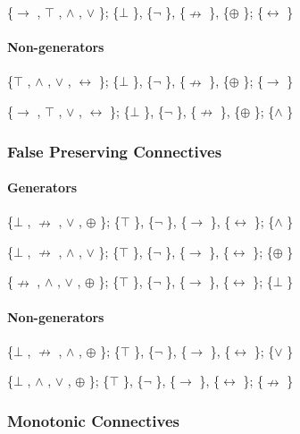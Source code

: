 \{$\to$ , $\top$ , $\land$ , $\lor$ \}; \{$\bot$ \}, \{$\neg$ \}, \{$\nrightarrow$ \}, \{$\oplus$ \}; \{$\leftrightarrow$ \}

\hypertarget{non-generators-3}{%
\paragraph{Non-generators}\label{non-generators-3}}

\{$\top$ , $\land$ , $\lor$ , $\leftrightarrow$ \}; \{$\bot$ \}, \{$\neg$ \}, \{$\nrightarrow$ \}, \{$\oplus$ \}; \{$\to$ \}

\{$\to$ , $\top$ , $\lor$ , $\leftrightarrow$ \}; \{$\bot$ \}, \{$\neg$ \}, \{$\nrightarrow$ \}, \{$\oplus$ \}; \{$\land$ \}

\hypertarget{false-preserving-connectives-1}{%
\subsubsection{False Preserving
Connectives}\label{false-preserving-connectives-1}}

\hypertarget{generators-4}{%
\paragraph{Generators}\label{generators-4}}

\{$\bot$ , $\nrightarrow$ , $\lor$ , $\oplus$ \}; \{$\top$ \}, \{$\neg$ \}, \{$\to$ \}, \{$\leftrightarrow$ \}; \{$\land$ \}

\{$\bot$ , $\nrightarrow$ , $\land$ , $\lor$ \}; \{$\top$ \}, \{$\neg$ \}, \{$\to$ \}, \{$\leftrightarrow$ \}; \{$\oplus$ \}

\{$\nrightarrow$ , $\land$ , $\lor$ , $\oplus$ \}; \{$\top$ \}, \{$\neg$ \}, \{$\to$ \}, \{$\leftrightarrow$ \}; \{$\bot$ \}

\hypertarget{non-generators-4}{%
\paragraph{Non-generators}\label{non-generators-4}}

\{$\bot$ , $\nrightarrow$ , $\land$ , $\oplus$ \}; \{$\top$ \}, \{$\neg$ \}, \{$\to$ \}, \{$\leftrightarrow$ \}; \{$\lor$ \}

\{$\bot$ , $\land$ , $\lor$ , $\oplus$ \}; \{$\top$ \}, \{$\neg$ \}, \{$\to$ \}, \{$\leftrightarrow$ \}; \{$\nrightarrow$ \}

\hypertarget{monotonic-connectives}{%
\subsubsection{\texorpdfstring{Monotonic Connectives
}{Monotonic Connectives }}\label{monotonic-connectives}}

